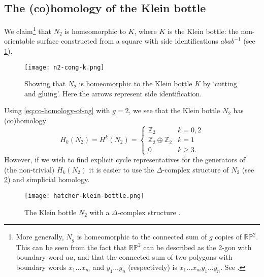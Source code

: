 \documentclass[12pt]{article}
\numberwithin{equation}{subsection}
\numberwithin{theorem}{subsection}
\numberwithin{lemma}{subsection}
\numberwithin{corollary}{subsection}
\numberwithin{definition}{subsection}
\numberwithin{example}{subsection}
\numberwithin{note}{subsection}
\newcommand{\zz}{\mathbb{Z}}
\newcommand{\rp}{\mathbb{R}\mathbb{P}}
\begin{document}


        \subsection{The (co)homology of the Klein bottle} %
        \label{sub:the_klein_bottle_co_homology}

            We claim\footnote{
                More generally, $N_g$ is homeomorphic to the connected sum of $g$ copies of $\rp^2$.
                This can be seen from the fact that $\rp^2$ can be described as the 2-gon with boundary word $aa$, and that the connected sum of two polygons with boundary words $x_1\ldots x_m$ and $y_1\ldots y_n$ (respectively) is $x_1\ldots x_my_1\ldots y_n$.
                See \cite[\S1.5]{Massey:1967we}.
            } that $N_2$ is homeomorphic to $K$, where $K$ is the Klein bottle: the non-orientable surface constructed from a square with side identifications $abab^{-1}$ (see \cref{fg:n2-cong-k}).

            \begin{figure}[ht]
                \centering
                \texttt{[image: n2-cong-k.png]}
                \caption{Showing that $N_2$ is homeomorphic to the Klein bottle $K$ by `cutting and gluing'. Here the arrows represent side identification.}\label{fg:n2-cong-k}
            \end{figure}

            Using \cref{eq:co-homology-of-ng} with $g=2$, we see that the Klein bottle $N_2$ has (co)homology
            \begin{equation}
                H_k(N_2) = H^k(N_2) =
                \begin{cases}
                    \zz_2 & k=0,2\\
                    \zz_2\oplus\zz_2 & k=1\\
                    0 & k\geqslant3.
                \end{cases}
            \end{equation}
            However, if we wish to find explicit cycle representatives for the generators of (the non-trivial) $H_k(N_2)$ it is easier to use the $\Delta$-complex structure of $N_2$ (see \cref{fg:hatcher-klein-bottle}) and simplicial homology.

            \begin{figure}[ht]
                \centering
                \texttt{[image: hatcher-klein-bottle.png]}
                \caption{The Klein bottle $N_2$ with a $\Delta$-complex structure \cite[p.~102,~\S2.1]{hatcher2002algebraic}.}\label{fg:hatcher-klein-bottle}
            \end{figure}
\end{document}
